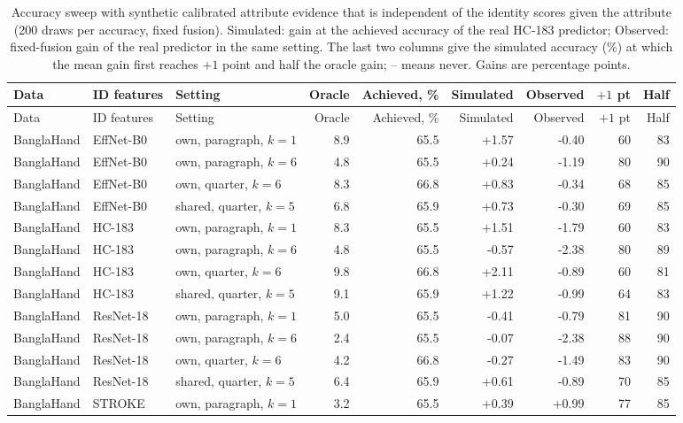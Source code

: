 \documentclass[10pt,a4paper]{article}
\begin{document}
{\footnotesize\setlength{\tabcolsep}{2.6pt}
\begin{longtable}{lllrrrrrr}
\caption{Accuracy sweep with synthetic calibrated attribute evidence that is independent of the identity scores given the attribute (200 draws per accuracy, fixed fusion). Simulated: gain at the achieved accuracy of the real HC-183 predictor; Observed: fixed-fusion gain of the real predictor in the same setting. The last two columns give the simulated accuracy (\%) at which the mean gain first reaches $+1$ point and half the oracle gain; -- means never. Gains are percentage points.}\label{tab:sweep}\\
\toprule Data & ID features & Setting & Oracle & Achieved, \% & Simulated & Observed & $+1$ pt & Half\\\midrule
\endfirsthead
\toprule Data & ID features & Setting & Oracle & Achieved, \% & Simulated & Observed & $+1$ pt & Half\\\midrule
\endhead
BanglaHand & EffNet-B0 & own, paragraph, $k=1$ & 8.9 & 65.5 & +1.57 & -0.40 & 60 & 83 \\
BanglaHand & EffNet-B0 & own, paragraph, $k=6$ & 4.8 & 65.5 & +0.24 & -1.19 & 80 & 90 \\
BanglaHand & EffNet-B0 & own, quarter, $k=6$ & 8.3 & 66.8 & +0.83 & -0.34 & 68 & 85 \\
BanglaHand & EffNet-B0 & shared, quarter, $k=5$ & 6.8 & 65.9 & +0.73 & -0.30 & 69 & 85 \\
BanglaHand & HC-183 & own, paragraph, $k=1$ & 8.3 & 65.5 & +1.51 & -1.79 & 60 & 83 \\
BanglaHand & HC-183 & own, paragraph, $k=6$ & 4.8 & 65.5 & -0.57 & -2.38 & 80 & 89 \\
BanglaHand & HC-183 & own, quarter, $k=6$ & 9.8 & 66.8 & +2.11 & -0.89 & 60 & 81 \\
BanglaHand & HC-183 & shared, quarter, $k=5$ & 9.1 & 65.9 & +1.22 & -0.99 & 64 & 83 \\
BanglaHand & ResNet-18 & own, paragraph, $k=1$ & 5.0 & 65.5 & -0.41 & -0.79 & 81 & 90 \\
BanglaHand & ResNet-18 & own, paragraph, $k=6$ & 2.4 & 65.5 & -0.07 & -2.38 & 88 & 90 \\
BanglaHand & ResNet-18 & own, quarter, $k=6$ & 4.2 & 66.8 & -0.27 & -1.49 & 83 & 90 \\
BanglaHand & ResNet-18 & shared, quarter, $k=5$ & 6.4 & 65.9 & +0.61 & -0.89 & 70 & 85 \\
BanglaHand & STROKE & own, paragraph, $k=1$ & 3.2 & 65.5 & +0.39 & +0.99 & 77 & 85 \\

\end{longtable}}
\end{document}
